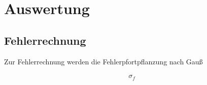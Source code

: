 \section{Auswertung}
\label{sec:Auswertung}

\subsection{Fehlerrechnung}
  Zur Fehlerrechnung werden die Fehlerpfortpflanzung nach Gauß

  \begin{align}
    \sigma_f
  \end{align}

